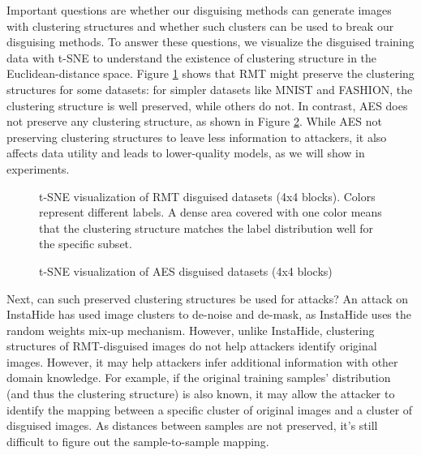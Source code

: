 \documentclass[conference]{IEEEtran}
\begin{document}
Important questions are whether our disguising methods can generate images with clustering structures and whether such clusters can be used to break our disguising methods. To answer these questions, we visualize the disguised training data with t-SNE \cite{maaten08} to understand the existence of clustering structure in the Euclidean-distance space.   Figure \ref{fig:RMT-cluster-vis} shows that RMT might preserve the clustering structures for some datasets: for simpler datasets like MNIST and FASHION, the clustering structure is well preserved, while others do not. In contrast, AES does not preserve any clustering structure, as shown in Figure \ref{fig:AES-cluster-vis}. While AES not preserving clustering structures to leave less information to attackers, it also affects data utility and leads to lower-quality models, as we will show in experiments. 
\begin{figure}[h]
\centering
{}
\caption{t-SNE visualization of RMT disguised datasets (4x4 blocks). Colors represent different labels. A dense area covered with one color means that the clustering structure matches the label distribution well for the specific subset.}\label{fig:RMT-cluster-vis}
\end{figure}

\begin{figure}[h]
\centering
{}
\caption{t-SNE visualization of AES disguised datasets (4x4 blocks)}\label{fig:AES-cluster-vis}
\end{figure}

Next, can such preserved clustering structures be used for attacks? An attack on InstaHide \cite{carlini21} has used image clusters to de-noise and de-mask, as InstaHide uses the random weights mix-up mechanism. However, unlike InstaHide, clustering structures of RMT-disguised images do not help attackers identify original images. However, it may help attackers infer additional information with other domain knowledge. For example, if the original training samples' distribution (and thus the clustering structure) is also known,  it may allow the attacker to identify the mapping between a specific cluster of original images and a cluster of disguised images. As distances between samples are not preserved, it's still difficult to figure out the sample-to-sample mapping. 
\end{document}
